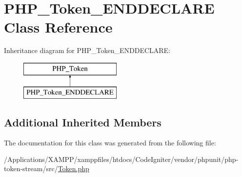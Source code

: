 \hypertarget{class_p_h_p___token___e_n_d_d_e_c_l_a_r_e}{}\section{P\+H\+P\+\_\+\+Token\+\_\+\+E\+N\+D\+D\+E\+C\+L\+A\+RE Class Reference}
\label{class_p_h_p___token___e_n_d_d_e_c_l_a_r_e}
Inheritance diagram for P\+H\+P\+\_\+\+Token\+\_\+\+E\+N\+D\+D\+E\+C\+L\+A\+RE\+:\begin{figure}[H]
\begin{center}
\leavevmode
\includegraphics[height=2.000000cm]{class_p_h_p___token___e_n_d_d_e_c_l_a_r_e}
\end{center}
\end{figure}
\subsection*{Additional Inherited Members}


The documentation for this class was generated from the following file\+:\begin{DoxyCompactItemize}
\item 
/\+Applications/\+X\+A\+M\+P\+P/xamppfiles/htdocs/\+Code\+Igniter/vendor/phpunit/php-\/token-\/stream/src/\mbox{\hyperlink{_token_8php}{Token.\+php}}\end{DoxyCompactItemize}
